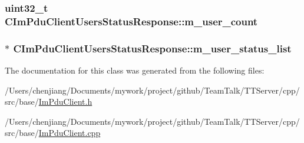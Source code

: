 \subsubsection[{m\+\_\+user\+\_\+count}]{\setlength{\rightskip}{0pt plus 5cm}uint32\+\_\+t C\+Im\+Pdu\+Client\+Users\+Status\+Response\+::m\+\_\+user\+\_\+count\hspace{0.3cm}{\ttfamily [private]}}\label{class_c_im_pdu_client_users_status_response_a646a2bf2da289cf7358a5cad5ab83526}
\hypertarget{class_c_im_pdu_client_users_status_response_afb971172d67e650fb6d374840505dba1}{}
\subsubsection[{m\+\_\+user\+\_\+status\+\_\+list}]{$\ast$ C\+Im\+Pdu\+Client\+Users\+Status\+Response\+::m\+\_\+user\+\_\+status\+\_\+list\hspace{0.3cm}{\ttfamily [private]}}\label{class_c_im_pdu_client_users_status_response_afb971172d67e650fb6d374840505dba1}


The documentation for this class was generated from the following files\+:\begin{DoxyCompactItemize}
\item 
/\+Users/chenjiang/\+Documents/mywork/project/github/\+Team\+Talk/\+T\+T\+Server/cpp/src/base/\hyperlink{_im_pdu_client_8h}{Im\+Pdu\+Client.\+h}\item 
/\+Users/chenjiang/\+Documents/mywork/project/github/\+Team\+Talk/\+T\+T\+Server/cpp/src/base/\hyperlink{_im_pdu_client_8cpp}{Im\+Pdu\+Client.\+cpp}\end{DoxyCompactItemize}

